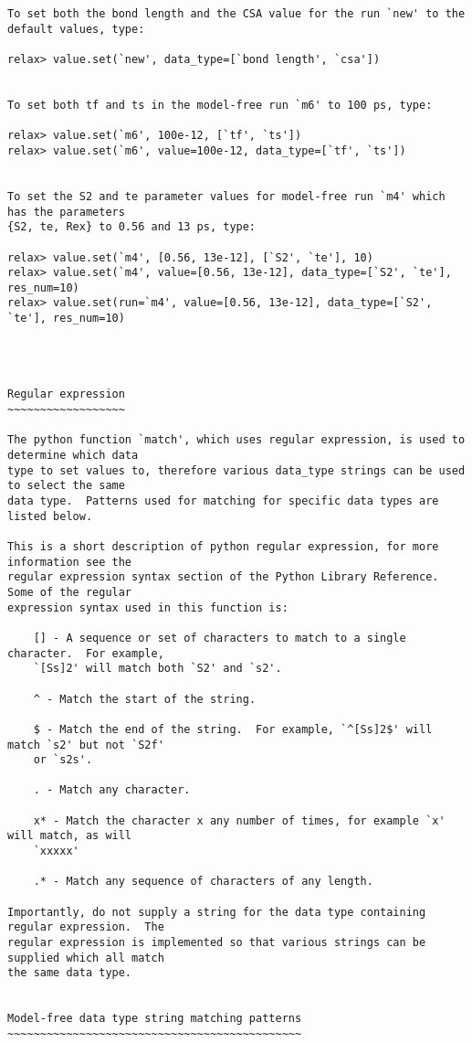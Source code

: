 {\begin{verbatim}
To set both the bond length and the CSA value for the run `new' to the default values, type:

relax> value.set(`new', data_type=[`bond length', `csa'])


To set both tf and ts in the model-free run `m6' to 100 ps, type:

relax> value.set(`m6', 100e-12, [`tf', `ts'])
relax> value.set(`m6', value=100e-12, data_type=[`tf', `ts'])


To set the S2 and te parameter values for model-free run `m4' which has the parameters
{S2, te, Rex} to 0.56 and 13 ps, type:

relax> value.set(`m4', [0.56, 13e-12], [`S2', `te'], 10)
relax> value.set(`m4', value=[0.56, 13e-12], data_type=[`S2', `te'], res_num=10)
relax> value.set(run=`m4', value=[0.56, 13e-12], data_type=[`S2', `te'], res_num=10)




Regular expression
~~~~~~~~~~~~~~~~~~

The python function `match', which uses regular expression, is used to determine which data
type to set values to, therefore various data_type strings can be used to select the same
data type.  Patterns used for matching for specific data types are listed below.

This is a short description of python regular expression, for more information see the
regular expression syntax section of the Python Library Reference.  Some of the regular
expression syntax used in this function is:

    [] - A sequence or set of characters to match to a single character.  For example,
    `[Ss]2' will match both `S2' and `s2'.

    ^ - Match the start of the string.

    $ - Match the end of the string.  For example, `^[Ss]2$' will match `s2' but not `S2f'
    or `s2s'.

    . - Match any character.

    x* - Match the character x any number of times, for example `x' will match, as will
    `xxxxx'

    .* - Match any sequence of characters of any length.

Importantly, do not supply a string for the data type containing regular expression.  The
regular expression is implemented so that various strings can be supplied which all match
the same data type.


Model-free data type string matching patterns
~~~~~~~~~~~~~~~~~~~~~~~~~~~~~~~~~~~~~~~~~~~~~


\end{verbatim}}
